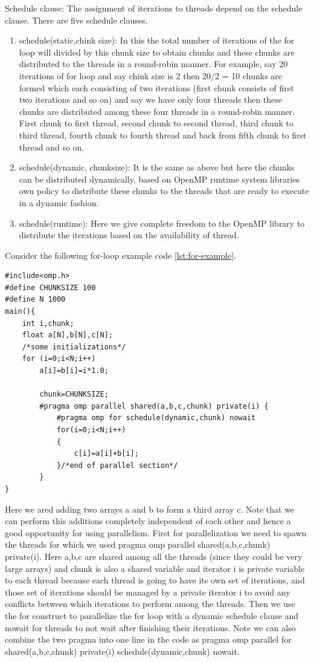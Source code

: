 \documentclass[12pt]{book}
\begin{document}
Schedule clause: The assignment of iterations to threads depend on the schedule clause.
There are five schedule clauses. 
\begin{enumerate}
    \item schedule(static,chink size): In this the total number of iterations of the for loop will divided by this chunk size to obtain chunks and these chunks are distributed to the threads in a round-robin manner.
    For example, say 20 iterations of for loop and say chink size is 2 then 20/2 = 10 chunks are formed which each consisting of two iterations (first chunk consists of first two iterations and so on) and say we have only four threads then these chunks are distributed among these four threads in a round-robin manner.
    First chunk to first thread, second chunk to second thread, third chunk to third thread, fourth chunk to fourth thread and back from fifth chunk to first thread and so on.
    \item schedule(dynamic, chunksize): It is the same as above but here the chunks can be distributed dynamically, based on  OpenMP runtime system libraries own policy to distribute these chunks to the 
    threads that are ready to execute in a dynamic fashion.
    \item schedule(runtime): Here we give complete freedom to the OpenMP library to distribute the iterations based on the availability of thread.
\end{enumerate}

Consider the following for-loop example code \ref{lst:for-example}.
\begin{lstlisting}[caption={for-Example: Addition of two Arrays},captionpos=b,label={lst:for-example}]
#include<omp.h>
#define CHUNKSIZE 100
#define N 1000
main(){
    int i,chunk;
    float a[N],b[N],c[N];
    /*some initializations*/
    for (i=0;i<N;i++)
        a[i]=b[i]=i*1.0;
    
        chunk=CHUNKSIZE;
        #pragma omp parallel shared(a,b,c,chunk) private(i) {
            #pragma omp for schedule(dynamic,chunk) nowait
            for(i=0;i<N;i++)
            {
                c[i]=a[i]+b[i];
            }/*end of parallel section*/
        }
}
\end{lstlisting}

Here we ared adding two arrays a and b to form a third array c.
Note that we can perform this additions completely independent of each other and hence a good opportunity 
for using parallelism.
First for parallelization we need to spawn the threads for which we used pragma omp parallel shared(a,b,c,chunk) private(i).
Here a,b,c are shared among all the threads (since they could be very large arrays) and chunk is also a shared variable and iterator i is private variable to each thread because each thread is going to 
have its own set of iterations, and those set of iterations should be managed by a private iterator i to avoid any conflicts between which iterations to perform among the threads. 
Then we use the for construct to parallelize the for loop with a dynamic schedule clause and nowait for threads to not wait after finishing their iterations.
Note we can also combine the two pragma into one line in the code as pragma omp parallel for shared(a,b,c,chunk) private(i) schedule(dynamic,chunk) nowait.
\end{document}
